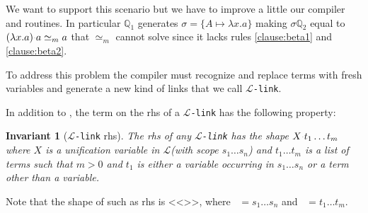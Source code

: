 \documentclass[sigconf,natbib=false,review]{acmart}
\newtheorem{invariant}{Invariant}
\newcommand{\appsep}{\ensuremath{\textcolor{lightgray}{\cdot}}}
\newcommand{\UnifRel}{\ensuremath{\simeq}}
\newcommand{\Ue}{\ensuremath{\UnifRel_m}\xspace}
\newcommand{\llambda}{\ensuremath{\mathcal{L}}\xspace}
\newcommand{\linkMacro}[1]{\ensuremath{#1}\texttt{-link}\xspace}
\newcommand{\linkbeta}{\linkMacro{\llambda}}
\newcommand{\rhs}{rhs\xspace}
\newcommand{\linkStore}{\texorpdfstring{\ensuremath{\mathbb{L}}\xspace}{L}}
\newcommand{\foUnifPb}{\ensuremath{\mathbb{P}}\xspace}
\newcommand{\hoUnifPb}{\ensuremath{\mathbb{Q}}\xspace}
\begin{document}

\noindent
We want to support this scenario but we have to improve a little our compiler
and \progress routines.
In particular $\hoUnifPb_1$ generates $\sigma = \{ A
\mapsto \lambda x. a\}$ making $\sigma\hoUnifPb_2$ equal to
$(\lambda x. a) \appsep a \Ue a$ that \Ue{} cannot solve since it
lacks rules \ref{clause:beta1} and \ref{clause:beta2}.

To address this problem the compiler must recognize and replace
\notllambda terms with fresh variables and generate a new kind of links
that we call \linkbeta.

In addition to , the term on the \rhs of a \linkbeta
has the following property:

\newcommand{\rhsBetaHead}{\ensuremath{X_{s_1\dots s_n}}}
\newcommand{\rhsBeta}{\ensuremath{\rhsBetaHead\appsep t_1\dots t_m}\xspace}

\begin{invariant}[\linkbeta \rhs]
  The \rhs of any \linkbeta has the shape $X\appsep t_1\dots t_m$
  where $X$ is a unification variable in \llambda (with scope $s_1\dots s_n$)
  and $t_1\dots t_m$ is a list of terms such that $m>0$ and
  $t_1$ is either a variable occurring in $s_1\dots s_n$ or
  a term other than a variable.
  \label{inv:beta-rhs}
\end{invariant}

\noindent Note that the shape of such as \rhs is
  <<>>, where ~$= s_1\dots s_n$
  and ~$=t_1\dots t_m$.
  


\end{document}

